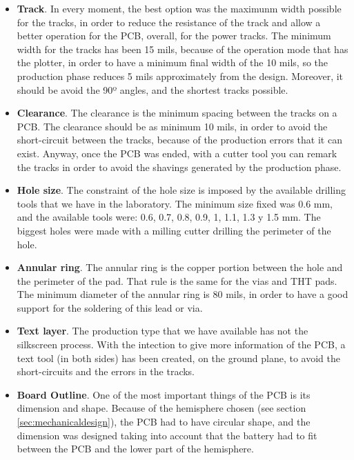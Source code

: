 \begin{itemize}

\item \textbf{Track}. In every moment, the best option was the maximunm width possible for the tracks, in order to reduce the resistance of the track and allow a better operation for the \acrshort{PCB}, overall, for the power tracks. The minimum width for the tracks has been 15 mils, because of the operation mode that has the plotter, in order to have a minimum final width of the 10 mils, so the production phase reduces 5 mils approximately from the design. 
Moreover, it should be avoid the 90º angles, and the shortest tracks possible.

\item \textbf{Clearance}. The clearance is the minimum spacing between the tracks on a \acrshort{PCB}. The clearance should be as minimum 10 mils, in order to avoid the short-circuit between the tracks, because of the production errors that it can exist. Anyway, once the \acrshort{PCB} was ended, with a cutter tool you can remark the tracks in order to avoid the shavings generated by the production phase.

\item \textbf{Hole size}. The constraint of the hole size is imposed by the available drilling tools that we have in the laboratory. The minimum size fixed was 0.6 mm, and the available tools were: 0.6, 0.7, 0.8, 0.9, 1, 1.1, 1.3 y 1.5 mm. The biggest holes were made with a milling cutter drilling the perimeter of the hole.


\item \textbf{Annular ring}. The annular ring is the copper portion between the hole and the perimeter of the pad. That rule is the same for the vias and \acrshort{THT} pads. The minimum diameter of the annular ring is 80 mils, in order to have a good support for the soldering of this lead or via.

\item \textbf{Text layer}. The production type that we have available has not the silkscreen process. With the intection to give more information of the \acrshort{PCB}, a text tool (in both sides) has been created, on the ground plane, to avoid the short-circuits and the errors in the tracks. 

\item \textbf{Board Outline}. One of the most important things of the PCB is its dimension and shape. Because of the hemisphere chosen (see section \ref{sec:mechanicaldesign}), the PCB had to have circular shape, and the dimension was designed taking into account that the battery had to fit between the PCB and the lower part of the hemisphere.

\end{itemize}

